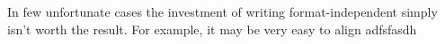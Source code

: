 
In few unfortunate cases the investment of writing format-independent \latex simply isn't worth the result. For example, it may be very easy to align adfsfasdh